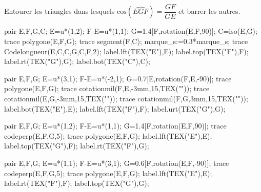 \begin{exercice*}
    Entourer les triangles dans lesquels \mbox{$\text{cos}(\widehat{EGF})=\dfrac{GF}{GE}$} et barrer les autres.
    
    \begin{minipage}{0.45\linewidth}
        \begin{Geometrie}
            pair E,F,G,C;
            E=u*(1,2);
            F-E=u*(1,1);            
            G=1.4[F,rotation(E,F,90)];
            C=iso(E,G);            
            trace polygone(E,F,G);
            trace segment(F,C);
            marque_s:=0.3*marque_s;
            trace Codelongueur(E,C,C,G,C,F,2);
            label.lft(TEX("E"),E);
            label.top(TEX("F"),F);
            label.rt(TEX("G"),G);
            label.bot(TEX("C"),C);
        \end{Geometrie}

        \bigskip
        \begin{Geometrie}
            pair E,F,G;
            E=u*(3,1);
            F-E=u*(-2,1);            
            G=0.7[E,rotation(F,E,-90)];            
            trace polygone(E,F,G);            
            trace cotationmil(F,E,-3mm,15,TEX(""));
            trace cotationmil(E,G,-3mm,15,TEX(""));
            trace cotationmil(F,G,3mm,15,TEX(""));
            label.bot(TEX("E"),E);
            label.lft(TEX("F"),F);
            label.urt(TEX("G"),G);
        \end{Geometrie}
    \end{minipage}
    \hfill
    \begin{minipage}{0.45\linewidth}
        \begin{Geometrie}
            pair E,F,G;
            E=u*(1,2);
            F-E=u*(1,1);            
            G=1.4[F,rotation(E,F,90)];
            trace codeperp(E,F,G,5);
            trace polygone(E,F,G);
            label.lft(TEX("E"),E);
            label.top(TEX("G"),F);
            label.rt(TEX("F"),G);
        \end{Geometrie}

        \bigskip
        \begin{Geometrie}
            pair E,F,G;
            E=u*(1,1);
            F-E=u*(3,1);            
            G=0.6[F,rotation(E,F,-90)];
            trace codeperp(E,F,G,5);
            trace polygone(E,F,G);
            label.lft(TEX("E"),E);
            label.rt(TEX("F"),F);
            label.top(TEX("G"),G);
        \end{Geometrie}
    \end{minipage}
\end{exercice*}
